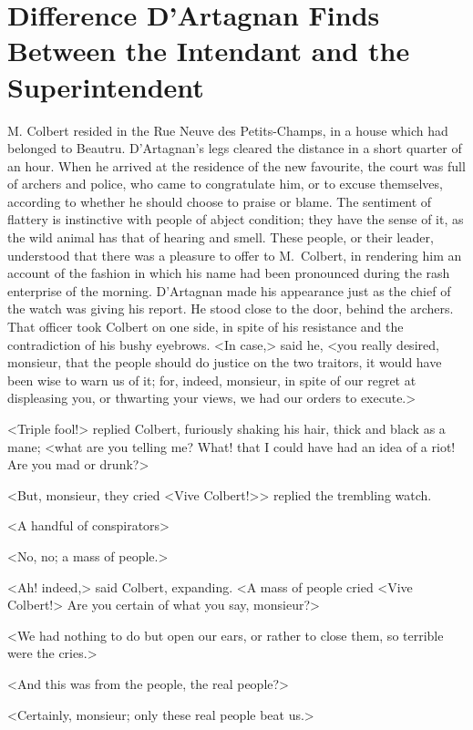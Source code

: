 \chapter{Difference D'Artagnan Finds Between the Intendant and the Superintendent}


\lettrine{M}{.} Colbert resided in the Rue Neuve des Petits-Champs, in a house which had belonged to Beautru. D'Artagnan's legs cleared the distance in a short quarter of an hour. When he arrived at the residence of the new favourite, the court was full of archers and police, who came to congratulate him, or to excuse themselves, according to whether he should choose to praise or blame. The sentiment of flattery is instinctive with people of abject condition; they have the sense of it, as the wild animal has that of hearing and smell. These people, or their leader, understood that there was a pleasure to offer to M.~Colbert, in rendering him an account of the fashion in which his name had been pronounced during the rash enterprise of the morning. D'Artagnan made his appearance just as the chief of the watch was giving his report. He stood close to the door, behind the archers. That officer took Colbert on one side, in spite of his resistance and the contradiction of his bushy eyebrows. <In case,> said he, <you really desired, monsieur, that the people should do justice on the two traitors, it would have been wise to warn us of it; for, indeed, monsieur, in spite of our regret at displeasing you, or thwarting your views, we had our orders to execute.>

<Triple fool!> replied Colbert, furiously shaking his hair, thick and black as a mane; <what are you telling me? What! that I could have had an idea of a riot! Are you mad or drunk?>

<But, monsieur, they cried <Vive Colbert!>> replied the trembling watch.

<A handful of conspirators\longdash>

<No, no; a mass of people.>

<Ah! indeed,> said Colbert, expanding. <A mass of people cried <Vive Colbert!> Are you certain of what you say, monsieur?>

<We had nothing to do but open our ears, or rather to close them, so terrible were the cries.>

<And this was from the people, the real people?>

<Certainly, monsieur; only these real people beat us.>

